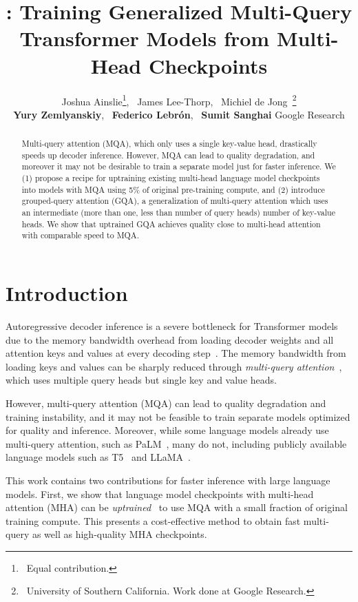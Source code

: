 \documentclass[11pt]{article}
\title{\gmq: Training Generalized Multi-Query Transformer Models from Multi-Head Checkpoints}
\author{
Joshua Ainslie\thanks{\- \ Equal contribution.},~ James Lee-Thorp\footnotemark[1],~ Michiel de Jong\footnotemark[1] \ \footnotemark[2]\thanks{\- \ University of Southern California. Work done at Google Research.} \\ 
{\bf Yury Zemlyanskiy},~ {\bf Federico Lebr\'{o}n},~ {\bf Sumit Sanghai}
  \AND
  {\rm \Large Google Research}\\
  }
\newcommand{\mh}{\textsc{MHA}\xspace}
\newcommand{\mq}{\textsc{MQA}\xspace}
\newcommand{\gmq}{\textsc{GQA}\xspace}
\newcommand{\fullgmq}{grouped-query\xspace}
\begin{document}
\maketitle
\begin{abstract}
Multi-query attention (\mq), which only uses a single key-value head, drastically speeds up decoder inference. However, \mq can lead to quality degradation, and moreover it may not be desirable to train a separate model just for faster inference. We (1) propose a recipe for uptraining existing multi-head language model checkpoints into models with \mq using 5\% of original pre-training compute, and (2) introduce \fullgmq attention (\gmq), a generalization of multi-query attention which uses an intermediate (more than one, less than number of query heads) number of key-value heads. We show that uptrained \gmq achieves quality close to multi-head attention with comparable speed to \mq.

\end{abstract}

\section{Introduction}
\label{section:intro}

Autoregressive decoder inference is a severe bottleneck for Transformer models due to the memory bandwidth overhead from loading decoder weights and all attention keys and values at every decoding step~\citep{shazeer2019mq, palminference, dejong2022fido}. The memory bandwidth from loading keys and values can be sharply reduced through \emph{multi-query attention}~\citep{shazeer2019mq}, which uses multiple query heads but single key and value heads.

However, multi-query attention (\mq) can lead to quality degradation and training instability, and it may not be feasible to train separate models optimized for quality and inference. Moreover, while some language models already use multi-query attention, such as PaLM~\citep{palm}, many do not, including publicly available language models such as T5~\citep{t5} and LLaMA~\citep{llama}. 

This work contains two contributions for faster inference with large language models. First, we show that language model checkpoints with multi-head attention (\mh) can be \emph{uptrained}~\citep{sparsemoe} to use \mq with a small fraction of original training compute. This presents a cost-effective method to obtain fast multi-query as well as high-quality \mh checkpoints.
\end{document}
